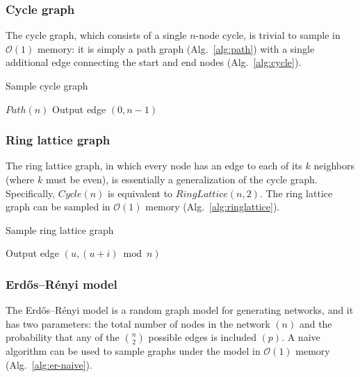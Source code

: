 \documentclass[a4paper,num-refs,gigabyte]{oup-contemporary}
\begin{document}
\subsubsection{Cycle graph}
The cycle graph, which consists of a single $n$-node cycle, is trivial to sample in $\mathcal{O}\left(1\right)$ memory: it is simply a path graph (Alg.~\ref{alg:path}) with a single additional edge connecting the start and end nodes (Alg.~\ref{alg:cycle}).

\begin{algorithm}[H]
\caption{Sample cycle graph}
\label{alg:cycle}
\begin{algorithmic}
  \State $Path\left(n\right)$
  \State Output edge $\left(0,n-1\right)$
\EndProcedure
\end{algorithmic}
\end{algorithm}

\subsubsection{Ring lattice graph}
The ring lattice graph, in which every node has an edge to each of its $k$ neighbors (where $k$ must be even), is essentially a generalization of the cycle graph. Specifically, $Cycle\left(n\right)$ is equivalent to $RingLattice\left(n,2\right)$. The ring lattice graph can be sampled in $\mathcal{O}\left(1\right)$ memory (Alg.~\ref{alg:ringlattice}).

\begin{algorithm}[H]
\caption{Sample ring lattice graph}
\label{alg:ringlattice}
\begin{algorithmic}
      \State Output edge $\left(u, \left(u+i\right)\bmod n\right)$
    \EndFor
  \EndFor
\EndProcedure
\end{algorithmic}
\end{algorithm}

\subsubsection{Erd{\H o}s--R\'enyi model}
The Erd{\H o}s--R\'enyi model is a random graph model for generating networks, and it has two parameters: the total number of nodes in the network $\left(n\right)$ and the probability that any of the $n\choose 2$ possible edges is included $\left(p\right)$. A naive algorithm can be used to sample graphs under the model in $\mathcal{O}\left(1\right)$ memory (Alg.~\ref{alg:er-naive}).
\end{document}
